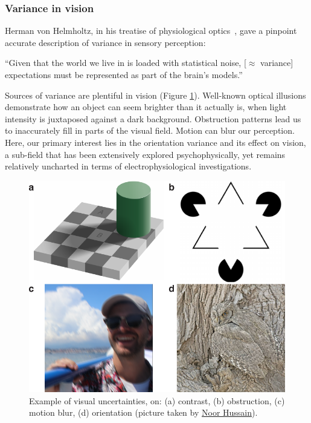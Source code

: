 \subsubsection{Variance in vision}
Herman von Helmholtz, in his treatise of physiological optics~\cite{helmholtz1925treatise}, gave a pinpoint accurate description of variance in sensory perception:
\begin{displayquote}
	“Given that the world we live in is loaded with statistical noise, [$\approx$ variance] expectations must be represented as part of the brain’s models.”
\end{displayquote}

Sources of variance are plentiful in vision (Figure \ref{fig_chap2_variance_psychophysics}). Well-known optical illusions demonstrate how an object can seem brighter than it actually is, when light intensity is juxtaposed against a dark background. Obstruction patterns lead us to inaccurately fill in parts of the visual field. Motion can blur our perception. Here, our primary interest lies in the orientation variance and its effect on vision, a sub-field that has been extensively explored psychophysically, yet remains relatively uncharted in terms of electrophysiological investigations.

\begin{figure}
\vspace{-0.25cm}
\centering
\includegraphics[width=.75\textwidth]{fig/chap2_fig_visionvariance.pdf}
\caption[Example of visual uncertainties.]{Example of visual uncertainties, on: (a) contrast, (b) obstruction, (c)  motion blur, (d) orientation (picture taken by \href{https://www.flickr.com/photos/noorhussain}{Noor Hussain}).}
\label{fig_chap2_variance_psychophysics}
\end{figure}

